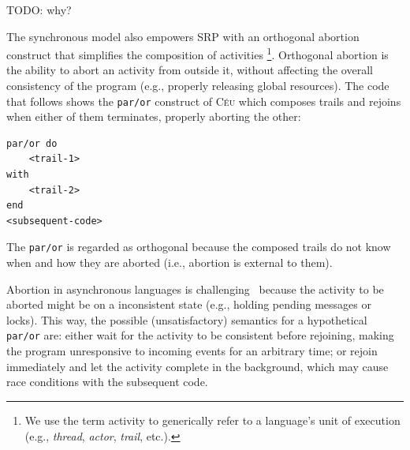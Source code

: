 \documentclass{acm_proc_article-sp}
\newcommand{\CEU}{\textsc{C\'{e}u}\xspace}
\newcommand{\code}[1] {{\small{\texttt{#1}}}}
\newcommand{\1}{\;}
\newcommand{\2}{\;\;}
\newcommand{\3}{\;\;\;}
\newcommand{\5}{\;\;\;\;\;}
\begin{document}
TODO: why?

The synchronous model also empowers SRP with an orthogonal abortion construct 
that simplifies the composition of activities%
\footnote{We use the term activity to generically refer to a language's unit of 
execution (e.g., \emph{thread}, \emph{actor}, \emph{trail}, etc.).}.
%
Orthogonal abortion is the ability to abort an activity from outside it, 
without affecting the overall consistency of the program (e.g., properly 
releasing global resources).
%
The code that follows shows the \code{par/or} construct of \CEU which composes 
trails and rejoins when either of them terminates, properly aborting the other:

\begin{lstlisting}
par/or do
    <trail-1>
with
    <trail-2>
end
<subsequent-code>
\end{lstlisting}

The \code{par/or} is regarded as orthogonal because the composed trails do not 
know when and how they are aborted (i.e., abortion is external to them).
%


Abortion in asynchronous languages is challenging~\cite{esterel.preemption} 
because the activity to be aborted might be on a inconsistent state (e.g., 
holding pending messages or locks).
%
This way, the possible (unsatisfactory) semantics for a hypothetical 
\code{par/or} are:
either wait for the activity to be consistent before rejoining, making the 
program unresponsive to incoming events for an arbitrary time;
or rejoin immediately and let the activity complete in the background, which 
may cause race conditions with the subsequent code.

\end{document}
